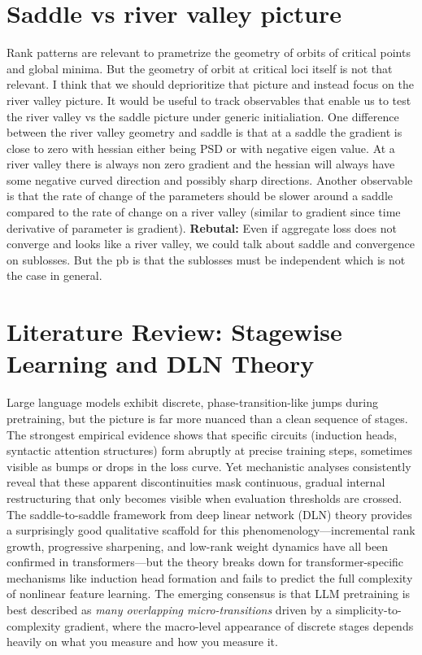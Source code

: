 \documentclass{article}
\theoremstyle{definition}
\begin{document}
\section{Saddle vs river valley picture}
Rank patterns are relevant to prametrize the geometry of orbits of critical points and global minima. But the geometry of orbit at critical loci itself is not that relevant. I think that we should deprioritize that picture and instead focus on the river valley picture. It would be useful to track observables that enable us to test the river valley vs the saddle picture under generic initialiation. One difference between the river valley geometry and saddle is that at a saddle the gradient is close to zero with hessian either being PSD or with negative eigen value. At a river valley there is always non zero gradient and the hessian will always have some negative curved direction and possibly sharp directions. Another observable is that the rate of change of the parameters should be slower around a saddle compared to the rate of change on a river valley (similar to gradient since time derivative of parameter is gradient).
\textbf{Rebutal:} Even if aggregate loss does not converge and looks like a river valley, we could talk about saddle and convergence on sublosses. But the pb is that the sublosses must be independent which is not the case in general.  
\section{Literature Review: Stagewise Learning and DLN Theory}
Large language models exhibit discrete, phase-transition-like jumps during pretraining, but the picture is far more nuanced than a clean sequence of stages. The strongest empirical evidence shows that specific circuits (induction heads, syntactic attention structures) form abruptly at precise training steps, sometimes visible as bumps or drops in the loss curve. Yet mechanistic analyses consistently reveal that these apparent discontinuities mask continuous, gradual internal restructuring that only becomes visible when evaluation thresholds are crossed. The saddle-to-saddle framework from deep linear network (DLN) theory provides a surprisingly good qualitative scaffold for this phenomenology---incremental rank growth, progressive sharpening, and low-rank weight dynamics have all been confirmed in transformers---but the theory breaks down for transformer-specific mechanisms like induction head formation and fails to predict the full complexity of nonlinear feature learning. The emerging consensus is that LLM pretraining is best described as \emph{many overlapping micro-transitions} driven by a simplicity-to-complexity gradient, where the macro-level appearance of discrete stages depends heavily on what you measure and how you measure it.
\end{document}
